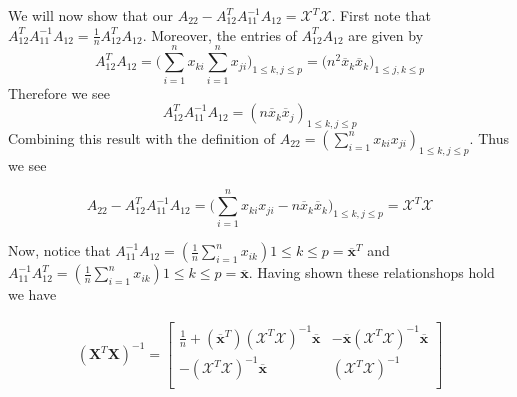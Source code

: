 \documentclass[12pt]{article}  %
\begin{document}
We will now show that our $A_{22}-A_{12}^{T}A_{11}^{-1}A_{12} = \mathcal{X}^{T}\mathcal{X}$. First note that $A_{12}^{T}A_{11}^{-1}A_{12} = \frac{1}{n}A_{12}^{T}A_{12}$. Moreover, the entries of $A_{12}^{T}A_{12}$ are given by $$A_{12}^{T}A_{12} = \big(\sum_{i=1}^{n}x_{ki}\sum_{i=1}^{n}x_{ji}\big)_{1\leq k,j\leq p} = (n^2\overline{x}_{k}\overline{x}_k\big)_{1\leq j,k\leq p}$$ Therefore we see $$A_{12}^{T}A_{11}^{-1}A_{12} = (n\overline{x}_k\overline{x}_j)_{1\leq k,j\leq p}$$
Combining this result with the definition of $A_{22} = (\sum_{i=1}^{n}x_{ki}x_{ji})_{1\leq k,j\leq p}$. Thus we see 

$$A_{22} - A_{12}^{T}A_{11}^{-1}A_{12} = \Big(\sum_{i=1}^{n}x_{ki}x_{ji} - n\overline{x}_k\overline{x}_k\Big)_{1\leq k,j\leq p} = \mathcal{X}^{T}\mathcal{X}$$

Now, notice that $A_{11}^{-1}A_{12} = (\frac{1}{n}\sum_{i=1}^{n}x_{ik})1\leq k\leq p = \mathbf{\overline{x}}^{T}$ and $A_{11}^{-1}A_{12}^{T} = (\frac{1}{n}\sum_{i=1}^{n}x_{ik})1\leq k\leq p = \mathbf{\overline{x}}$. Having shown these relationshops hold we have 

\begin{align*}
(\mathbf{X}^{T}\mathbf{X})^{-1} = \begin{bmatrix}
\frac{1}{n} +(\mathbf{\overline{x}}^{T})(\mathcal{X}^{T}\mathcal{X})^{-1}\mathbf{\overline{x}} & -\mathbf{\overline{x}}(\mathcal{X}^{T}\mathcal{X})^{-1}\mathbf{\overline{x}}\\
-(\mathcal{X}^{T}\mathcal{X})^{-1}\mathbf{\overline{x}} & (\mathcal{X}^{T}\mathcal{X})^{-1}\\
\end{bmatrix}
\end{align*}
\end{document}
